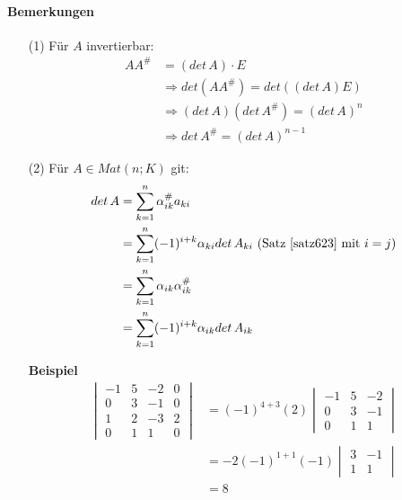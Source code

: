 \documentclass[11pt]{report}
\newcommand*\f[1] {\textbf{#1}}
\begin{document}
\paragraph{Bemerkungen}
\begin{itemize}
\item[(1)] Für $A$ invertierbar:
\begin{align}
AA^{\#} &= (det \, A) \cdot E \\
&\Rightarrow det(AA^{\#}) = det((det \, A) E) \\
&\Rightarrow (det \, A) (det \, A^{\#}) = (det \, A)^n \\
&\Rightarrow det \, A^{\#} = (det \, A)^{n-1}
\end{align}
\item[(2)] Für $A \in Mat(n;K)$ git:
\begin{align}
det \, A &= \sum_{k=1}^{n} \alpha_{ik}^{\#} a_{ki} \\
&= \sum_{k=1}^{n} (-1)^{i+k} \alpha_{ki} det \, A_{ki} \text{ (Satz \ref{satz623} mit $i=j$)}\\
&= \sum_{k=1}^{n} \alpha_{ik} \alpha_{ik}^{\#} \\
&=  \sum_{k=1}^{n} (-1)^{i+k} \alpha_{ik} det \, A_{ik} 
\end{align}

\f{Beispiel}
\begin{align}
\begin{vmatrix}
-1 & 5 & -2 & 0 \\ 0 & 3 & -1 & 0 \\ 1 & 2 & -3 & 2 \\ 0 & 1 & 1 & 0
\end{vmatrix} &= (-1)^{4+3} (2) 
\begin{vmatrix}
-1 & 5 & -2 \\ 0 & 3 & -1 \\ 0 & 1 & 1
\end{vmatrix} \\
&= -2 (-1)^{1+1} (-1) \begin{vmatrix} 3 & -1 \\ 1 & 1 \end{vmatrix} \\
&= 8
\end{align}


\end{itemize}
\end{document}
